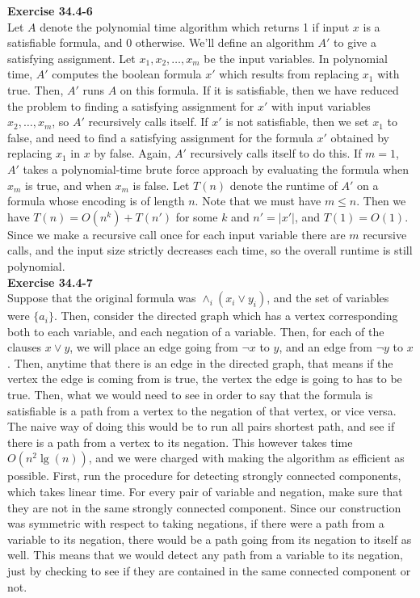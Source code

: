 \documentclass{article}
\begin{document}
\noindent\textbf{Exercise 34.4-6}\\

Let $A$ denote the polynomial time algorithm which returns 1 if input $x$ is a satisfiable formula, and 0 otherwise.  We'll define an algorithm $A'$ to give a satisfying assignment.  Let $x_1, x_2, \ldots, x_m$ be the input variables.  In polynomial time, $A'$ computes the boolean formula $x'$ which results from replacing $x_1$ with true. Then, $A'$ runs $A$ on this formula.  If it is satisfiable, then we have reduced the problem to finding a satisfying assignment for $x'$ with input variables $x_2, \ldots, x_m$, so $A'$ recursively calls itself.  If $x'$ is not satisfiable, then we set $x_1$ to false, and need to find a satisfying assignment for the formula $x'$ obtained by replacing $x_1$ in $x$ by false.  Again, $A'$ recursively calls itself to do this.  If $m=1$, $A'$ takes a polynomial-time brute force approach by evaluating the formula when $x_m$ is true, and when $x_m$ is false.  Let $T(n)$ denote the runtime of $A'$ on a formula whose encoding is of length $n$.  Note that we must have $m \leq n$.  Then we have $T(n) = O(n^k) + T(n')$ for some $k$ and $n' = |x'|$, and $T(1) = O(1)$.  Since we make a recursive call once for each input variable there are $m$ recursive calls, and the input size strictly decreases each time, so the overall runtime is still polynomial.  \\

\noindent\textbf{Exercise 34.4-7}\\
Suppose that the original formula was $\wedge_i (x_i \vee y_i)$, and the set of variables were $\{a_i\}$. Then, consider the directed graph which has a vertex corresponding both to each variable, and each negation of a variable. Then, for each of the clauses $x \vee y$, we will place an edge going from $\neg x$ to $y$, and an edge from $\neg y$ to $x$. Then, anytime that there is an edge in the directed graph, that means if the vertex the edge is coming from is true, the vertex the edge is going to has to be true. Then, what we would need to see in order to say that the formula is satisfiable is a path from a vertex to the negation of that vertex, or vice versa. The naive way of doing this would be to run all pairs shortest path, and see if there is a path from a vertex to its negation. This however takes time $O(n^2\lg(n))$, and we were charged with making the algorithm as efficient as possible. First, run the procedure for detecting strongly connected components, which takes linear time. For every pair of variable and negation, make sure that they are not in the same strongly connected component. Since our construction was symmetric with respect to taking negations, if there were a path from a variable to its negation, there would be a path going from its negation to itself as well. This means that we would detect any path from a variable to its negation, just by checking to see if they are contained in the same connected component or not.\\
\end{document}
